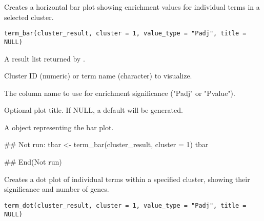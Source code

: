 \documentclass[a4paper]{book}
\begin{document}
%
\begin{Description}
Creates a horizontal bar plot showing enrichment values for individual terms
in a selected cluster.
\end{Description}
%
\begin{Usage}
\begin{verbatim}
term_bar(cluster_result, cluster = 1, value_type = "Padj", title = NULL)
\end{verbatim}
\end{Usage}
%
\begin{Arguments}
\begin{ldescription}
\item[\code{cluster\_result}] A result list returned by .

\item[\code{cluster}] Cluster ID (numeric) or term name (character) to visualize.

\item[\code{value\_type}] The column name to use for enrichment significance ("Padj" or "Pvalue").

\item[\code{title}] Optional plot title. If NULL, a default will be generated.
\end{ldescription}
\end{Arguments}
%
\begin{Value}
A  object representing the bar plot.
\end{Value}
%
\begin{Examples}
\begin{ExampleCode}
## Not run: 
tbar <- term_bar(cluster_result, cluster = 1)
tbar

## End(Not run)
\end{ExampleCode}
\end{Examples}
%
\begin{Description}
Creates a dot plot of individual terms within a specified cluster, showing
their significance and number of genes.
\end{Description}
%
\begin{Usage}
\begin{verbatim}
term_dot(cluster_result, cluster = 1, value_type = "Padj", title = NULL)
\end{verbatim}
\end{Usage}
%
\end{document}
